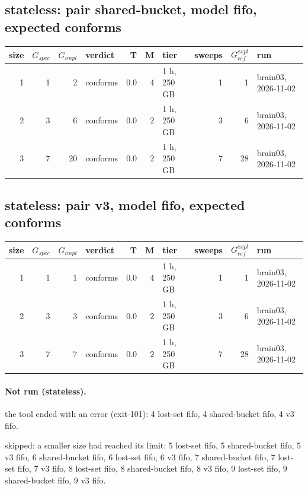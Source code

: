\documentclass[10pt]{article}
\begin{document}
\subsection*{stateless: pair \textsf{shared-bucket}, model fifo, expected conforms}
\begin{longtable}{@{}rrrlrrlrrl@{}}
\toprule
size & $G_{\mathit{spec}}$ & $G_{\mathit{impl}}$ & verdict & T & M & tier & sweeps & $G_{\mathit{ref}}^{\mathit{expl}}$ & run \\
\midrule
\endhead
\color{blue} 1 & 1 & 2 & conforms & 0.0 & 4 & 1 h, 250 GB & 1 & 1 & brain03, 2026-11-02 \\
\color{blue} 2 & 3 & 6 & conforms & 0.0 & 2 & 1 h, 250 GB & 3 & 6 & brain03, 2026-11-02 \\
\color{blue} 3 & 7 & 20 & conforms & 0.0 & 2 & 1 h, 250 GB & 7 & 28 & brain03, 2026-11-02 \\
\bottomrule
\end{longtable}
\subsection*{stateless: pair \textsf{v3}, model fifo, expected conforms}
\begin{longtable}{@{}rrrlrrlrrl@{}}
\toprule
size & $G_{\mathit{spec}}$ & $G_{\mathit{impl}}$ & verdict & T & M & tier & sweeps & $G_{\mathit{ref}}^{\mathit{expl}}$ & run \\
\midrule
\endhead
\color{blue} 1 & 1 & 1 & conforms & 0.0 & 4 & 1 h, 250 GB & 1 & 1 & brain03, 2026-11-02 \\
\color{blue} 2 & 3 & 3 & conforms & 0.0 & 2 & 1 h, 250 GB & 3 & 6 & brain03, 2026-11-02 \\
\color{blue} 3 & 7 & 7 & conforms & 0.0 & 2 & 1 h, 250 GB & 7 & 28 & brain03, 2026-11-02 \\
\bottomrule
\end{longtable}
\paragraph{Not run (stateless).}
the tool ended with an error (exit-101): 4 lost-set fifo, 4 shared-bucket fifo, 4 v3 fifo.\par
skipped: a smaller size had reached its limit: 5 lost-set fifo, 5 shared-bucket fifo, 5 v3 fifo, 6 shared-bucket fifo, 6 lost-set fifo, 6 v3 fifo, 7 shared-bucket fifo, 7 lost-set fifo, 7 v3 fifo, 8 lost-set fifo, 8 shared-bucket fifo, 8 v3 fifo, 9 lost-set fifo, 9 shared-bucket fifo, 9 v3 fifo.\par
\end{document}
